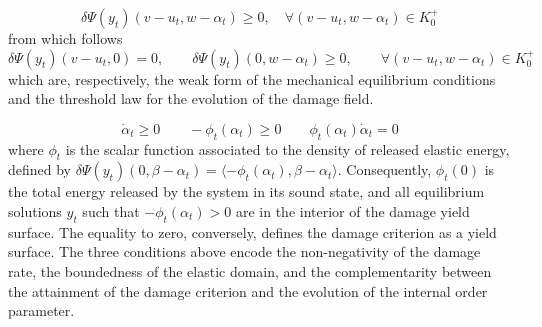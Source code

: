 \begin{equation}
    \label{eq:eq_variational_inequality}
    \delta \Psi(y_t)(v-u_t, w-\alpha_t) \geq 0, \quad \forall
    (v-u_t, w - \alpha_t) \in K^+_{0}        
\end{equation}
% 
% 
from which follows 
\begin{equation}
    \label{eq:variational_equilibrium} 
    \delta \Psi(y_t)(v-u_t, 0) = 0, \qquad \delta \Psi(y_t)(0, w-\alpha_t) \geq 0, \qquad \forall (v-u_t, w-\alpha_t) \in K^+_{0}
\end{equation}
which are, respectively, the weak form of the mechanical equilibrium conditions and the threshold law for the evolution of the damage field.

\begin{equation}
    \label{eq:complementarity}
    \dot \alpha_t \geq 0 \qquad 
     -\phi_t(\alpha_t) \geq 0 \qquad
     \phi_t(\alpha_t)\dot \alpha_t = 0
\end{equation}
where $\phi_t$ is the scalar function associated to the density of  released elastic energy, defined by $\delta \Psi(y_t)(0, \beta - \alpha_t) = \langle -\phi_t(\alpha_t), \beta - \alpha_t\rangle$.
Consequently, $\phi_t(0)$ is the total energy released by the system in its sound state, and all equilibrium solutions $y_t$ such that $-\phi_t(\alpha_t) > 0$ are in the interior of the damage yield surface.
The equality to zero, conversely, defines the damage criterion as a yield surface.
The three conditions above encode the non-negativity of the damage rate, the boundedness of the elastic domain, and the complementarity between the attainment of the damage criterion and the evolution of the internal order parameter. 

